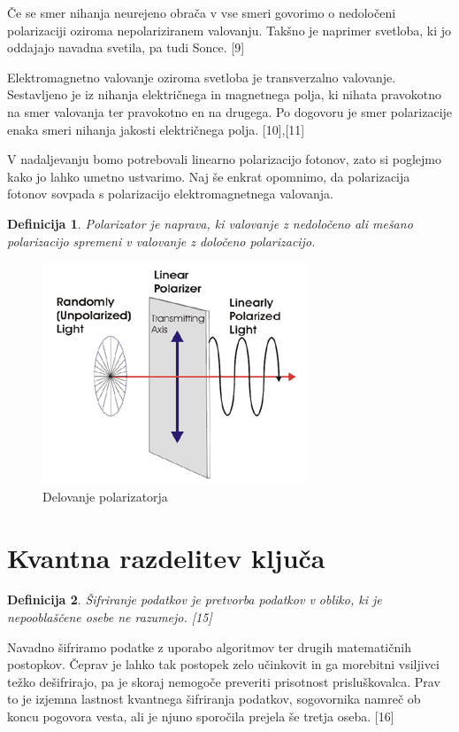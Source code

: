 \documentclass[A4paper, 11pt]{article}
\newtheorem{definicija}{Definicija}
\begin{document}
Če se smer nihanja neurejeno obrača v vse smeri govorimo o nedoločeni polarizaciji oziroma nepolariziranem valovanju. Takšno je naprimer svetloba, ki jo oddajajo navadna svetila, pa tudi Sonce. [9]

Elektromagnetno valovanje oziroma svetloba je transverzalno valovanje. Sestavljeno je iz nihanja električnega in magnetnega polja, ki nihata pravokotno na smer valovanja ter pravokotno en na drugega. Po dogovoru je smer polarizacije enaka smeri nihanja jakosti električnega polja. [10],[11]

V nadaljevanju bomo potrebovali linearno polarizacijo fotonov, zato si poglejmo kako jo lahko umetno ustvarimo. Naj še enkrat opomnimo, da polarizacija fotonov sovpada s polarizacijo elektromagnetnega valovanja. 

\begin{definicija}
Polarizator je naprava, ki valovanje z nedoločeno ali mešano polarizacijo spremeni v valovanje z določeno polarizacijo.
\end{definicija}

\begin{figure}[h]
\centering
\caption{Delovanje polarizatorja}
\includegraphics[scale=0.7]{linear-figure-1}
\end{figure}



\section{Kvantna razdelitev ključa}

\begin{definicija}
Šifriranje podatkov je pretvorba podatkov v obliko, ki je nepooblaščene osebe ne razumejo. [15]
\end{definicija}

Navadno šifriramo podatke z uporabo algoritmov ter drugih matematičnih postopkov. Čeprav je lahko tak postopek zelo učinkovit in ga morebitni vsiljivci težko dešifrirajo, pa je skoraj nemogoče preveriti prisotnost prisluškovalca. Prav to je izjemna lastnost kvantnega šifriranja podatkov, sogovornika namreč ob koncu pogovora vesta, ali je njuno sporočila prejela še tretja oseba. [16]
\end{document}
